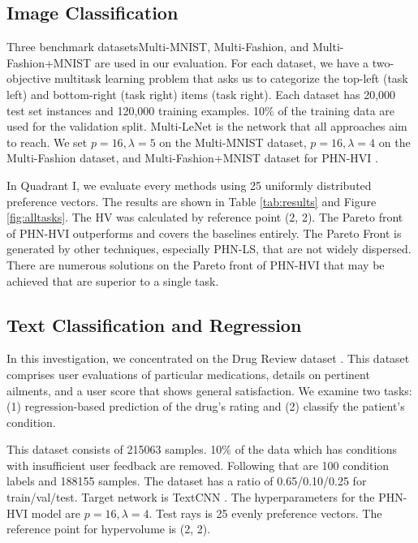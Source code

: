\documentclass[letterpaper]{article} %
\newcommand{\ourmodel}{PHN-HVI }
\begin{document}
\subsection{Image Classification}
Three benchmark datasetsMulti-MNIST, Multi-Fashion, and Multi-Fashion+MNIST \cite{lin2019pareto} are used in our evaluation. For each dataset, we have a two-objective multitask learning problem that asks us to categorize the top-left (task left) and bottom-right (task right) items (task right). Each dataset has 20,000 test set instances and 120,000 training examples. 10\% of the training data are used for the validation split. Multi-LeNet \cite{sener2019multitask} is the network that all approaches aim to reach. We set $p=16, \lambda=5$ on the Multi-MNIST dataset, $p=16, \lambda=4$ on the Multi-Fashion dataset, and Multi-Fashion+MNIST dataset for \ourmodel.


In Quadrant I, we evaluate every methods using 25 uniformly distributed preference vectors. The results are shown in Table \ref{tab:results} and Figure \ref{fig:alltasks}. The HV was calculated by reference point (2, 2). The Pareto front of \ourmodel outperforms and covers the baselines entirely. The Pareto Front is generated by other techniques, especially PHN-LS, that are not widely dispersed. There are numerous solutions on the Pareto front of \ourmodel that may be achieved that are superior to a single task.

\subsection{Text Classification and Regression}


In this investigation, we concentrated on the Drug Review dataset \cite{Felix2018}. This dataset comprises user evaluations of particular medications, details on pertinent ailments, and a user score that shows general satisfaction. We examine two tasks: (1) regression-based prediction of the drug's rating and (2) classify the patient's condition.

This dataset consists of 215063 samples. 10\% of the data which has conditions with insufficient user feedback are removed.
Following that are 100 condition labels and 188155 samples. The dataset has a ratio of 0.65/0.10/0.25 for train/val/test. Target network is TextCNN \cite{TextCNN}. The hyperparameters for the \ourmodel model are $p=16, \lambda=4$. Test rays is 25 evenly preference vectors. The reference point for hypervolume is (2, 2).
\end{document}
